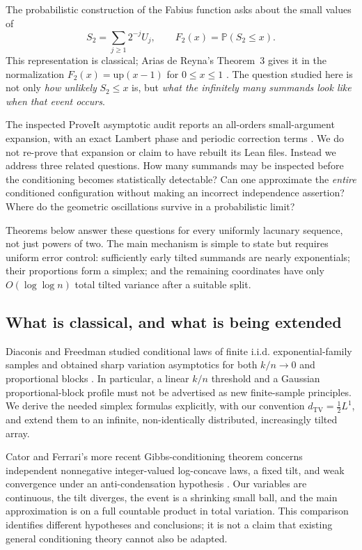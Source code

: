\documentclass[11pt,letterpaper]{article}
\numberwithin{equation}{section}
\theoremstyle{definition}
\theoremstyle{remark}
\newcommand{\PP}{\mathbb P}
\newcommand{\TV}{d_{\mathrm{TV}}}
\begin{document}
The probabilistic construction of the Fabius function asks about the small
values of
\begin{equation}
 S_2=\sum_{j\ge1}2^{-j}U_j,\qquad F_2(x)=\PP(S_2\le x).
 \label{eq:fabius}
\end{equation}
This representation is classical; Arias de Reyna's Theorem~3 gives it in the
normalization $F_2(x)=\mathrm{up}(x-1)$ for $0\le x\le1$
\cite{arias}. The question studied here is not only \emph{how unlikely} $S_2\le x$
is, but \emph{what the infinitely many summands look like when that event occurs}.

The inspected ProveIt asymptotic audit reports an all-orders small-argument
expansion, with an exact Lambert phase and periodic correction terms
\cite{repo}. We do not re-prove that expansion or claim to have rebuilt its
Lean files. Instead we address three related questions. How many summands may
be inspected before the conditioning becomes statistically detectable? Can
one approximate the \emph{entire} conditioned configuration without making an
incorrect independence assertion? Where do the geometric oscillations survive
in a probabilistic limit?

Theorems below answer these questions for every uniformly lacunary sequence,
not just powers of two. The main mechanism is simple to state but requires
uniform error control: sufficiently early tilted summands are nearly
exponentials; their proportions form a simplex; and the remaining coordinates
have only $O(\log\log n)$ total tilted variance after a suitable split.

\subsection{What is classical, and what is being extended}

Diaconis and Freedman studied conditional laws of finite i.i.d.
exponential-family samples and obtained sharp variation asymptotics for both
$k/n\to0$ and proportional blocks \cite{df}. In particular, a linear $k/n$
threshold and a Gaussian proportional-block profile must not be advertised
as new finite-sample principles. We derive the needed simplex formulas
explicitly, with our convention $\TV=\tfrac12 L^1$, and extend them to an
infinite, non-identically distributed, increasingly tilted array.

Cator and Ferrari's more recent Gibbs-conditioning theorem concerns
independent nonnegative integer-valued log-concave laws, a fixed tilt, and weak
convergence under an anti-condensation hypothesis \cite{cf}. Our variables are
continuous, the tilt diverges, the event is a shrinking small ball, and the
main approximation is on a full countable product in total variation. This
comparison identifies different hypotheses and conclusions; it is not a
claim that existing general conditioning theory cannot also be adapted.
\end{document}
